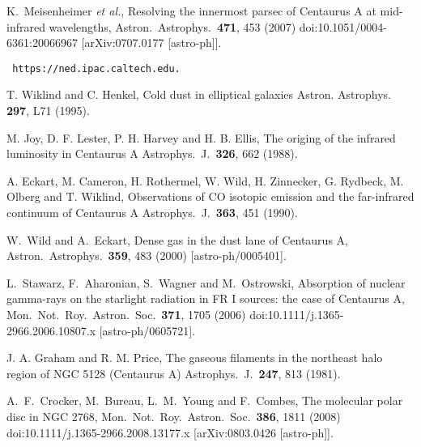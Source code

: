 \documentclass[aps,prd,twocolumn,superscriptaddress,tightenlines,nofootinbib]{revtex4-1}
\begin{document}
\begin{thebibliography}{99}
  K.~Meisenheimer {\it et al.},
   {\color{rossoCP3} Resolving the innermost parsec of Centaurus A at mid-infrared wavelengths},
  Astron.\ Astrophys.\  {\bf 471}, 453 (2007)
  doi:10.1051/0004-6361:20066967
  [arXiv:0707.0177 [astro-ph]].


 {\tt
  https://ned.ipac.caltech.edu.}

T. Wiklind and C. Henkel,
  {\color{rossoCP3} Cold dust in elliptical galaxies}
Astron. Astrophys. {\bf 297}, L71 (1995).


 M. Joy, D. F. Lester, P. H. Harvey and
 H. B. Ellis,
  {\color{rossoCP3} The origing of the infrared luminosity in
    Centaurus A}
Astrophys.\ J.\ {\bf 326}, 662 (1988).

A. Eckart, M. Cameron, H. Rothermel, W. Wild, H. Zinnecker,
G. Rydbeck, M. Olberg and T. Wiklind,
  {\color{rossoCP3} Observations of CO isotopic emission and the
    far-infrared continuum of Centaurus A}
Astrophys.\ J.\ {\bf 363}, 451 (1990).


  W.~Wild and A.~Eckart,
    {\color{rossoCP3} Dense gas in the dust lane of Centaurus A},
  Astron.\ Astrophys.\  {\bf 359}, 483 (2000)
  [astro-ph/0005401].


  L.~Stawarz, F.~Aharonian, S.~Wagner and M.~Ostrowski,
    {\color{rossoCP3} Absorption of nuclear gamma-rays on the starlight radiation in FR I sources: the case of Centaurus A},
  Mon.\ Not.\ Roy.\ Astron.\ Soc.\  {\bf 371}, 1705 (2006)
  doi:10.1111/j.1365-2966.2006.10807.x
  [astro-ph/0605721].


 J. A. Graham and R. M. Price,
  {\color{rossoCP3} The gaseous filaments in the northeast halo region of NGC 5128 (Centaurus A)}
Astrophys.\ J.\ {\bf 247}, 813 (1981).



  A.~F.~Crocker, M.~Bureau, L.~M.~Young and F.~Combes,
 {\color{rossoCP3}   The molecular polar disc in NGC 2768},
  Mon.\ Not.\ Roy.\ Astron.\ Soc.\  {\bf 386}, 1811 (2008)
  doi:10.1111/j.1365-2966.2008.13177.x
  [arXiv:0803.0426 [astro-ph]].




\end{thebibliography}
\end{document}
